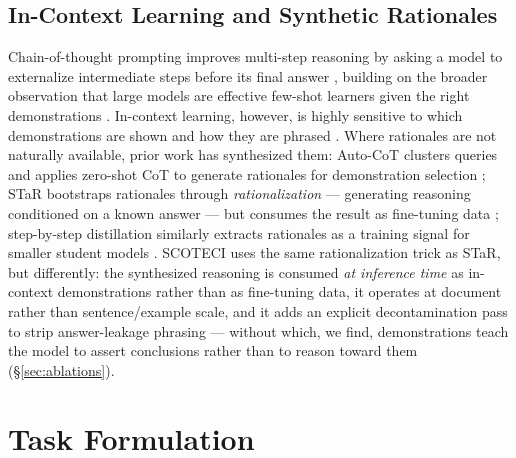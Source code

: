 \documentclass[11pt]{article}
\newcommand{\method}{SCOTECI}
\begin{document}
\subsection{In-Context Learning and Synthetic Rationales}
Chain-of-thought prompting improves multi-step reasoning by asking a model to
externalize intermediate steps before its final answer \citep{wei2022chain},
building on the broader observation that large models are effective few-shot
learners given the right demonstrations \citep{brown2020language}. In-context
learning, however, is highly sensitive to which demonstrations are shown and how
they are phrased \citep{liu2022makes, min2022rethinking}. Where rationales are not
naturally available, prior work has synthesized them: Auto-CoT clusters queries and
applies zero-shot CoT to generate rationales for demonstration selection
\citep{zhang2023autocot}; STaR bootstraps rationales through
\emph{rationalization} --- generating reasoning conditioned on a known answer ---
but consumes the result as fine-tuning data \citep{zelikman2022star}; step-by-step
distillation similarly extracts rationales as a training signal for smaller student
models \citep{hsieh2023distilling}. \method{} uses the same rationalization trick as
STaR, but differently: the synthesized reasoning is consumed \emph{at inference
time} as in-context demonstrations rather than as fine-tuning data, it operates at
document rather than sentence/example scale, and it adds an explicit decontamination
pass to strip answer-leakage phrasing --- without which, we find, demonstrations
teach the model to assert conclusions rather than to reason toward them
(\S\ref{sec:ablations}).

\section{Task Formulation}
\label{sec:task}
\end{document}
